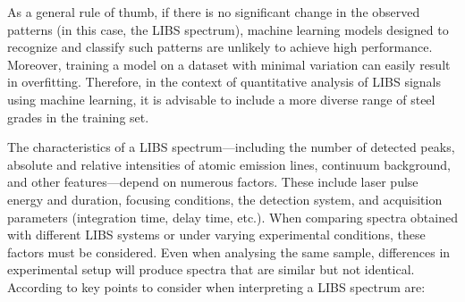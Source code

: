 \documentclass[12pt,a4paper]{article}
\begin{document}
	
	As a general rule of thumb, if there is no significant change in the observed patterns (in this case, the LIBS spectrum), machine learning models designed to recognize and classify such patterns are unlikely to achieve high performance. Moreover, training a model on a dataset with minimal variation can easily result in overfitting. Therefore, in the context of quantitative analysis of LIBS signals using machine learning, it is advisable to include a more diverse range of steel grades in the training set.
	
	
	The characteristics of a LIBS spectrum---including the number of detected peaks, absolute and relative intensities of atomic emission lines, continuum background, and other features---depend on numerous factors. These include laser pulse energy and duration, focusing conditions, the detection system, and acquisition parameters (integration time, delay time, etc.).  
	When comparing spectra obtained with different LIBS systems or under varying experimental conditions, these factors must be considered. Even when analysing the same sample, differences in experimental setup will produce spectra that are similar but not identical. According to \cite{AppliedPhotonics2019LIBSQualitative} key points to consider when interpreting a LIBS spectrum are:
	
\end{document}
